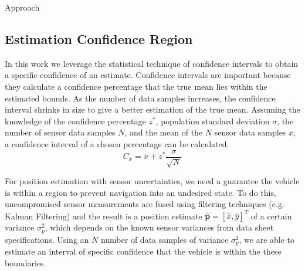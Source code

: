\begin{section}{Approach}
\subsection{Estimation Confidence Region}

In this work we leverage the statistical technique of confidence intervals to obtain a specific confidence of an estimate. Confidence intervals are important because they calculate a confidence percentage that the true mean lies within the estimated bounds. As the number of data samples increases, the confidence interval shrinks in size to give a better estimation of the true mean. Assuming the knowledge of the confidence percentage $z^{*}$, population standard deviation $\sigma$, the number of sensor data samples $N$, and the mean of the $N$ sensor data samples $ \bar{x} $, a confidence interval of a chosen percentage can be calculated:
    \begin{equation}
     \label{Confidence_interval}
		C_x = \bar{x} + z^{*}\frac{\sigma}{\sqrt{N}}
	\end{equation}
	
	
For position estimation with sensor uncertainties, we need a guarantee the vehicle is within a region to prevent navigation into an undesired state. To do this, uncompromised sensor measurements are fused using filtering techniques (e.g. Kalman Filtering) and the result is a position estimate $\hat{\bm{p}}=[\hat{x},\hat{y}]^T$ of a certain variance $\sigma_p^2$, which depends on the known sensor variances from data sheet specifications. Using an $N$ number of data samples of variance $\sigma_p^2$, we are able to estimate an interval of specific confidence that the vehicle is within the these boundaries.



\end{section}
